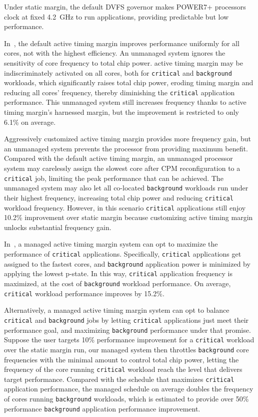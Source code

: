 Under static margin, the default DVFS governor makes POWER7+ processors clock at fixed 4.2~GHz to run applications, providing predictable but low performance. 

In~, the default active timing margin improves performance uniformly for all cores, not with the highest efficiency. An unmanaged system ignores the sensitivity of core frequency to total chip power. active timing margin may be indiscriminately activated on all cores, both for \texttt{critical} and \texttt{background} workloads, which significantly raises total chip power, eroding timing margin and reducing all cores' frequency, thereby diminishing the \texttt{critical} application performance. This unmanaged system still increases frequency thanks to active timing margin's harnessed margin, but the improvement is restricted to only 6.1\% on average.

Aggressively customized active timing margin provides more frequency gain, but an unmanaged system prevents the processor from providing maximum benefit. Compared with the default active timing margin, an unmanaged processor system may carelessly assign the slowest core after CPM reconfiguration to a \texttt{critical} job, limiting the peak performance that can be achieved. The unmanaged system may also let all co-located \texttt{background} workloads run under their highest frequency, increasing total chip power and reducing \texttt{critical} workload frequency. However, in this scenario \texttt{critical} applications still enjoy 10.2\% improvement over static margin because customizing active timing margin unlocks substantial frequency gain.

In~, a managed active timing margin system can opt to maximize the performance of \texttt{critical} applications. Specifically, \texttt{critical} applications get assigned to the fastest cores, and \texttt{background} application power is minimized by applying the lowest p-state. In this way, \texttt{critical} application frequency is maximized, at the cost of \texttt{background} workload performance. On average, \texttt{critical} workload performance improves by 15.2\%.

Alternatively, a managed active timing margin system can opt to balance \texttt{critical} and \texttt{background} jobs by letting \texttt{critical} applications just meet their performance goal, and maximizing \texttt{background} performance under that promise. Suppose the user targets 10\% performance improvement for a \texttt{critical} workload over the static margin run, our managed system then throttles \texttt{background} core frequencies with the minimal amount to control total chip power, letting the frequency of the core running \texttt{critical} workload reach the level that delivers target performance. Compared with the schedule that maximizes \texttt{critical} application performance, the managed schedule on average doubles the frequency of cores running \texttt{background} workloads, which is estimated to provide over 50\% performance \texttt{background} application performance improvement.

